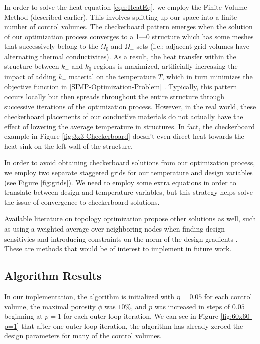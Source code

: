 In order to solve the heat equation \eqref{eqn:HeatEq}, we employ the Finite Volume Method (described earlier). This involves splitting up our space into a finite number of control volumes. The checkerboard pattern emerges when the solution of our optimization process converges to a 1---0 structure which has some meshes that successively belong to the $\Omega_0$ and $\Omega_+$ sets (i.e.: adjacent grid volumes have alternating thermal conductivites). As a result, the heat transfer within the structure between $k_+$ and $k_0$ regions is maximized, artificially increasing the impact of adding $k_+$ material on the temperature $T$, which in turn minimizes the objective function in \eqref{SIMP-Optimization-Problem} \cite{Versteeg2007}. Typically, this pattern occurs locally but then spreads throughout the entire structure through successive iterations of the optimization process. However, in the real world, these checkerboard placements of our conductive materials do not actually have the effect of lowering the average temperature in structures. In fact, the checkerboard example in Figure \ref{fig:3x3-Checkerboard} doesn't even direct heat towards the heat-sink on the left wall of the structure.

In order to avoid obtaining checkerboard solutions from our optimization process, we employ two separate staggered grids for our temperature and design variables (see Figure \ref{fig:grids}). We need to employ some extra equations in order to translate between design and temperature variables, but this strategy helps solve the issue of convergence to checkerboard solutions.

Available literature on topology optimization propose other solutions as well, such as using a weighted average over neighboring nodes when finding design sensitivies and introducing constraints on the norm of the design gradients \cite{Sigmund1998}. These are methods that would be of interest to implement in future work.

\subsection{Algorithm Results}

In our implementation, the algorithm is initialized with $\eta=0.05$ for each control volume, the maximal porosity $\overline{\phi}$ was $10\%$, and $p$ was increased in steps of $0.05$ beginning at $p=1$ for each outer-loop iteration. We can see in Figure \ref{fig:60x60-p=1} that after one outer-loop iteration, the algorithm has already zeroed the design parameters for many of the control volumes.

